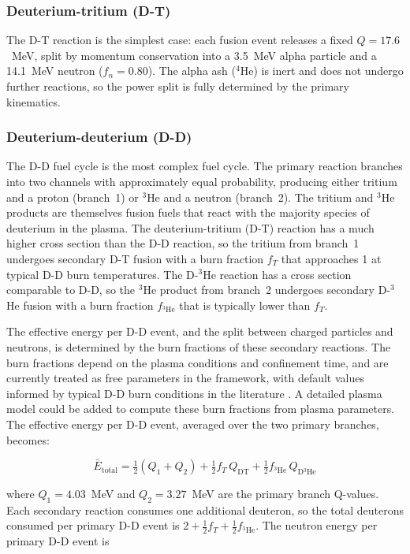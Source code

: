 \documentclass{article}
\begin{document}
\subsubsection{Deuterium-tritium (D-T)}
The D-T reaction is the simplest case: each fusion event releases a
fixed $Q = 17.6$~MeV, split by momentum conservation into a 3.5~MeV
alpha particle and a 14.1~MeV neutron ($f_n = 0.80$). The alpha ash
(${}^4$He) is inert and does not undergo further reactions, so the
power split is fully determined by the primary kinematics.

\subsubsection{Deuterium-deuterium (D-D)}
The D-D fuel cycle is the most complex fuel cycle. The primary reaction
branches into two channels with approximately equal probability, producing
either tritium and a proton (branch~1) or ${}^3$He and a neutron (branch~2).
The tritium and ${}^3$He products are themselves fusion fuels that react
with the majority species of deuterium in the plasma. The deuterium-tritium
(D-T) reaction has a much higher cross section than the D-D reaction, so the tritium
from branch~1 undergoes secondary D-T fusion with a burn fraction $f_T$ that
approaches 1 at typical D-D burn temperatures. The D-${}^3$He reaction
has a cross section comparable to D-D, so the ${}^3$He product
from branch~2 undergoes secondary D-${}^3$He fusion with a burn fraction 
$f_{{}^3\text{He}}$ that is typically lower than $f_T$.

The effective energy per D-D event, and the split between charged particles and neutrons,
is determined by the burn fractions of these secondary reactions. 
The burn fractions depend on the plasma conditions and confinement time, and are
currently treated as free parameters in the framework, with default values
informed by typical D-D burn conditions in the literature \citep{huba2016}.
A detailed plasma model could be added to compute these burn fractions from plasma parameters.
The effective energy per D-D event, averaged over the two primary branches, becomes:

\begin{equation}
\label{eq:dd-etotal}
\bar{E}_{\text{total}} = \tfrac{1}{2}(Q_1 + Q_2)
  + \tfrac{1}{2} f_T \, Q_{\text{DT}}
  + \tfrac{1}{2} f_{{}^3\text{He}} \, Q_{\text{D}{}^3\text{He}}
\end{equation}

\noindent where $Q_1 = 4.03$~MeV and $Q_2 = 3.27$~MeV are the primary
branch Q-values. Each secondary reaction consumes one additional
deuteron, so the total deuterons consumed per primary D-D event is
$2 + \tfrac{1}{2} f_T + \tfrac{1}{2} f_{{}^3\text{He}}$.
The neutron energy per primary D-D event is
\end{document}
